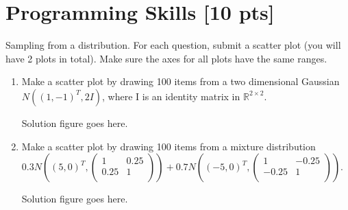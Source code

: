 \documentclass[a4paper]{article}
\theoremstyle{definition}
\newenvironment{soln}{
	\leavevmode\color{blue}\ignorespaces
}{}
\begin{document}
	\section{Programming Skills [10 pts]}
	Sampling from a distribution.  For each question, submit a scatter plot (you will have 2 plots in total).  Make sure the axes for all plots have the same ranges.
	\begin{enumerate}
		\item Make a scatter plot by drawing 100 items from a two dimensional Gaussian $N((1, -1)^{T}, 2I)$, where I is an identity matrix in $\mathbb{R}^{2 \times 2}$.
		
			\begin{soln}
			Solution figure goes here.\\
		\end{soln}
	
		\item Make a scatter plot by drawing 100 items from a mixture distribution 
		$0.3 N\left((5, 0)^{T}, \begin{pmatrix} 1 & 0.25 \\ 0.25 & 1\\ \end{pmatrix}\right)
		+0.7 N\left((-5, 0)^{T}, \begin{pmatrix} 1 & -0.25 \\ -0.25 & 1\\ \end{pmatrix}\right)
		$.
		
		\begin{soln}
		Solution figure goes here.\\
	\end{soln}
	\end{enumerate}
	
	
	
	
	
	
	
\end{document}
